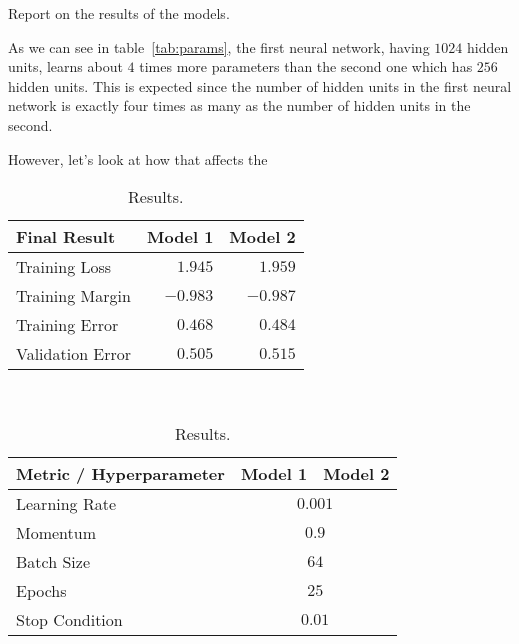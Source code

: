 \documentclass[11pt, reqno]{amsart}
\begin{document}
\newpage
\begin{problem}[1]
  Report on the results of the models.

  As we can see in table~\ref{tab:params}, the first neural network,
  having $1024$ hidden units, learns about $4$ times more parameters
  than the second one which has $256$ hidden units.
  This is expected since the number of hidden units in the first neural
  network is exactly four times as many as the number of hidden units in the second.

  \step
  However, let's look at how that affects the 

  \step
    \begin{table}[h]
      \begin{minipage}{.4\textwidth}
        \centering
        \begin{tabular}{| l | r | r |}
          \bottomrule
          Final Result                & Model 1     & Model 2 \\   
          \midrule
          Training Loss               & $1.945$     & $1.959$ \\
          Training Margin             & $-0.983$    & $-0.987$ \\
          Training Error              & $0.468$     & $0.484$	 \\
          Validation Error            & $0.505$     & $0.515$ \\
          \toprule
        \end{tabular}
        \caption{Results.}~\label{tab:results}
      \end{minipage}%
      \begin{minipage}{.6\textwidth}
        \centering
        \begin{tabular}{| l | r | r |}
          \bottomrule
          Metric / Hyperparameter   & Model 1     & Model 2 \\
          \midrule
          Learning Rate             & \multicolumn{2}{c|}{$0.001$}                                    \\ 
          Momentum                  & \multicolumn{2}{c|}{$0.9$}                                      \\ 
          Batch Size                & \multicolumn{2}{c|}{$64$}                                       \\ 
          Epochs                    & \multicolumn{2}{c|}{$25$}                                       \\ 
          Stop Condition            & \multicolumn{2}{c|}{$0.01$}                                     \\

\end{tabular}
\end{minipage}
\end{table}
\end{problem}
\end{document}

